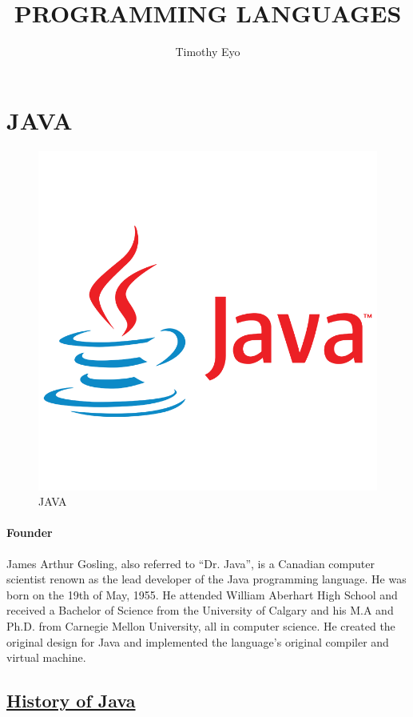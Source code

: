 \documentclass[12pt]{article}
\title{PROGRAMMING LANGUAGES}
\author{Timothy Eyo}
\begin{document}
	\maketitle
	\newpage
	\section*{\Huge{JAVA}}
		\begin{figure}
			\centering
			\includegraphics[width=0.7\linewidth]{"kisspng-logo-java-development-kit-portable-network-graphic-5d0f25d6adc385.3528057515612738147117 (2)"}
			\caption{JAVA}
			\label{fig:kisspng-logo-java-development-kit-portable-network-graphic-5d0f25d6adc385}
\end{figure}
	    \begin{minipage}{0.59\linewidth}
	    	\paragraph{Founder}
	        James Arthur Gosling, also referred to “Dr. Java”, is a Canadian computer scientist renown as the lead developer of the Java programming language. He was born on the 19th of May, 1955. He attended William Aberhart High School and received a Bachelor of Science from the University of Calgary and his M.A and Ph.D. from Carnegie Mellon University, all in computer science. He created the original design for Java and implemented the language’s original compiler and virtual machine.
	    	
	    	\textbf{\large}
	    \end{minipage}
       
    \subsection*{\Large \underline{History of Java}}
\end{document}
